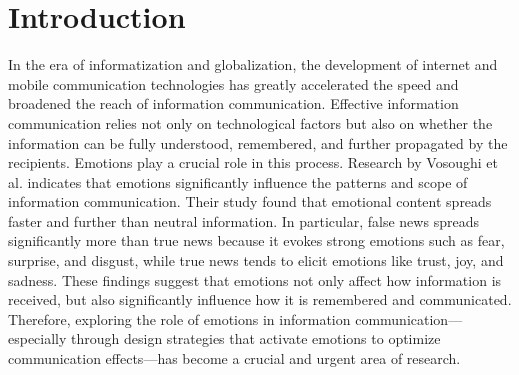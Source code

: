 \section{Introduction}




In the era of informatization and globalization, the development of internet and mobile communication technologies has greatly accelerated the speed and broadened the reach of information communication. Effective information communication relies not only on technological factors but also on whether the information can be fully understood, remembered, and further propagated by the recipients. Emotions play a crucial role in this process. Research by Vosoughi et al. \cite{vosoughi2018spread} indicates that emotions significantly influence the patterns and scope of information communication. Their study found that emotional content spreads faster and further than neutral information. In particular, false news spreads significantly more than true news because it evokes strong emotions such as fear, surprise, and disgust, while true news tends to elicit emotions like trust, joy, and sadness. These findings suggest that emotions not only affect how information is received, but also significantly influence how it is remembered and communicated. Therefore, exploring the role of emotions in information communication—especially through design strategies that activate emotions to optimize communication effects—has become a crucial and urgent area of research.

